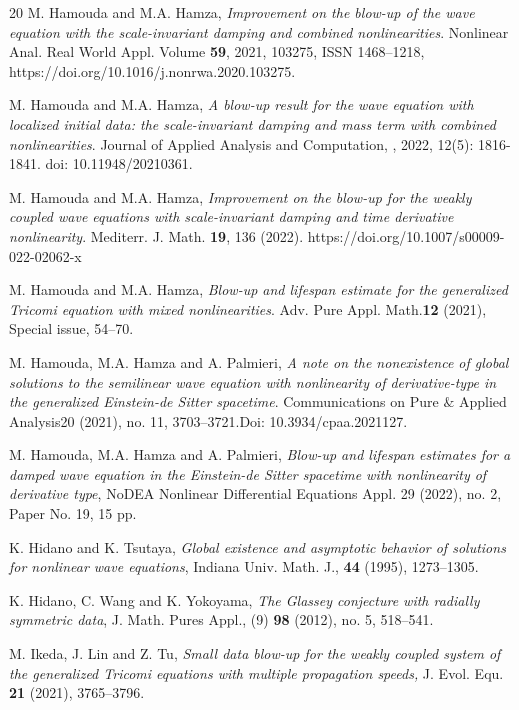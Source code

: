 \documentclass[12pt,leqno]{amsart}
\numberwithin{equation}{section}
\theoremstyle{remark}
\begin{document}
\begin{thebibliography}{20}
{M. Hamouda and M.A. Hamza}, {\it  Improvement on the blow-up of the wave equation  with the  scale-invariant damping and combined nonlinearities}. Nonlinear Anal. Real World Appl. Volume {\bf 59}, 2021, 103275, ISSN 1468--1218, https://doi.org/10.1016/j.nonrwa.2020.103275.

{M. Hamouda and M.A. Hamza}, {\it  A blow-up result for the wave equation  with localized initial data: the  scale-invariant damping and mass term with combined nonlinearities}. Journal of Applied Analysis and Computation, , 2022, 12(5): 1816-1841. doi: 10.11948/20210361.

{M. Hamouda and M.A. Hamza}, {\it  Improvement on the blow-up for  the weakly coupled wave equations  with  scale-invariant damping and time derivative nonlinearity}. Mediterr. J. Math. {\bf 19}, 136 (2022). https://doi.org/10.1007/s00009-022-02062-x


{M. Hamouda and M.A. Hamza}, {\it  Blow-up and lifespan estimate for the generalized Tricomi equation with mixed nonlinearities}. {Adv. Pure Appl. Math.}{\bf 12} (2021), Special issue, 54--70.

{M. Hamouda, M.A. Hamza and A. Palmieri}, {\it  A note on the nonexistence of global solutions to the semilinear wave equation with nonlinearity of derivative-type in the generalized Einstein-de Sitter spacetime}. {Communications on Pure $\&$ Applied Analysis}{20 (2021), no. 11, 3703--3721.}{Doi: 10.3934/cpaa.2021127.}

{M. Hamouda, M.A. Hamza and A. Palmieri}, {\it  Blow-up and lifespan estimates for a damped wave equation in the Einstein-de Sitter spacetime with nonlinearity of derivative type}, NoDEA Nonlinear Differential Equations Appl. 29 (2022), no. 2, Paper No. 19, 15 pp.



{K. Hidano and K. Tsutaya}, {\it Global existence and asymptotic behavior of solutions for nonlinear wave
equations}, Indiana Univ. Math. J., {\bf 44} (1995), 1273--1305.


{K. Hidano, C. Wang and K. Yokoyama}, {\it The Glassey conjecture with radially symmetric data}, J. Math.
Pures Appl.,  (9) {\bf 98} (2012),  no. 5, 518--541.


{M. Ikeda, J.  Lin and Z. Tu}, {\it Small data blow-up for the weakly coupled system of the generalized Tricomi equations with multiple propagation speeds,} J. Evol. Equ. {\bf 21} (2021), 3765--3796.


\end{thebibliography}
\end{document}
